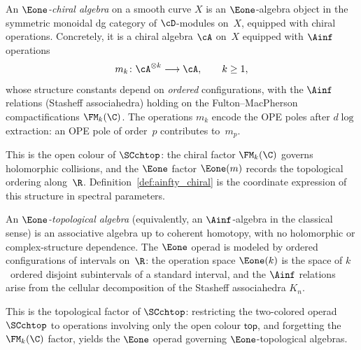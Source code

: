 \begin{definition}
\label{def:e1-chiral-algebra}
An \emph{$\Eone$-chiral algebra} on a smooth curve $X$ is an
$\Eone$-algebra object in the symmetric monoidal dg category of
$\cD$-modules on~$X$, equipped with chiral operations. Concretely, it is a chiral algebra $\cA$ on~$X$
equipped with $\Ainf$ operations
\[
m_k \colon \cA^{\otimes k} \longrightarrow \cA,
\qquad k \ge 1,
\]
whose structure constants depend on \emph{ordered} configurations,
with the $\Ainf$ relations (Stasheff associahedra) holding on the
Fulton--MacPherson compactifications $\FM_k(\C)$. The operations
$m_k$ encode the OPE poles after $d\!\log$ extraction: an OPE pole
of order~$p$ contributes to~$m_p$.

This is the open colour of $\SCchtop$: the chiral factor
$\FM_k(\C)$ governs holomorphic collisions, and the $\Eone$ factor
$\Eone(m)$ records the topological ordering along~$\R$.
Definition~\ref{def:ainfty_chiral} is the coordinate expression of
this structure in spectral parameters.
\end{definition}

\begin{definition}
\label{def:e1-topological-algebra}
An \emph{$\Eone$-topological algebra} (equivalently, an
$\Ainf$-algebra in the classical sense) is an associative algebra up
to coherent homotopy, with no holomorphic or complex-structure
dependence. The $\Eone$ operad is modeled by ordered configurations
of intervals on~$\R$: the operation space $\Eone(k)$ is the space of
$k$~ordered disjoint subintervals of a standard interval, and the
$\Ainf$ relations arise from the cellular decomposition of the
Stasheff associahedra $K_n$.

This is the topological factor of $\SCchtop$: restricting the
two-colored operad $\SCchtop$ to operations involving only the open
colour $\mathsf{top}$, and forgetting the $\FM_k(\C)$ factor, yields
the $\Eone$ operad governing $\Eone$-topological algebras.
\end{definition}

